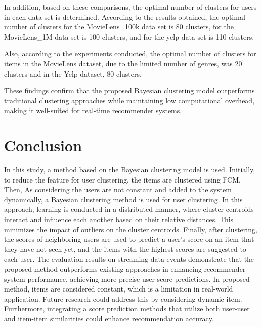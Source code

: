 \documentclass{article}
\begin{document}
In addition, based on these comparisons, the optimal number of clusters for users in each data set is determined. According to the results obtained, the optimal number of clusters for the MovieLens\_100k data set is 80 clusters, for the MovieLens\_1M data set is 100 clusters, and for the yelp data set is 110 clusters.

Also, according to the experiments conducted, the optimal number of clusters for items in the MovieLens dataset, due to the limited number of genres, was 20 clusters and in the Yelp dataset, 80 clusters.

These findings confirm that the proposed Bayesian clustering model outperforms traditional clustering approaches while maintaining low computational overhead, making it well-suited for real-time recommender systems.

\section{Conclusion}
In this study, a method based on the Bayesian clustering model is used. Initially, to reduce the feature for user clustering, the items are clustered using FCM. Then, As considering the users are not constant and added to the system dynamically, a Bayesian clustering method is used for user clustering. In this approach, learning is conducted in a distributed manner, where cluster centroids interact and influence each another based on their relative distances. This minimizes the impact of outliers on the cluster centroids. Finally, after clustering, the scores of neighboring users are used to predict a user's score on an item that they have not seen yet, and the items with the highest scores are suggested to each user. The evaluation results on streaming data events demonstrate that the proposed method outperforms existing approaches in enhancing recommender system performance, achieving more precise user score predictions. In proposed method, items are considered constant, which is a limitation in real-world application. Future research could address this by considering dynamic item. Furthermore, integrating a score prediction methods that utilize both user-user and item-item similarities could enhance recommendation accuracy.

% 
\printbibliography
\end{document}
